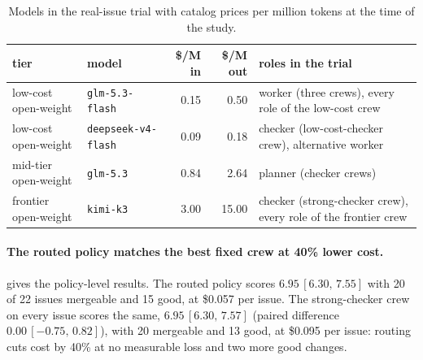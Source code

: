\documentclass[11pt,a4paper]{article}
\theoremstyle{definition}
\theoremstyle{remark}
\theoremstyle{definition}
\newcommand{\ci}[2]{\,[#1,\,#2]}
\begin{document}
\begin{table}[tbp]
\centering\small
\begin{tabularx}{\textwidth}{llrrX}\toprule
tier & model & \$/M in & \$/M out & roles in the trial\\\midrule
low-cost open-weight & \texttt{glm-5.3-flash} & 0.15 & 0.50 & worker (three crews), every role of the low-cost crew\\
low-cost open-weight & \texttt{deepseek-v4-flash} & 0.09 & 0.18 & checker (low-cost-checker crew), alternative worker\\
mid-tier open-weight & \texttt{glm-5.3} & 0.84 & 2.64 & planner (checker crews)\\
frontier open-weight & \texttt{kimi-k3} & 3.00 & 15.00 & checker (strong-checker crew), every role of the frontier crew\\
\bottomrule\end{tabularx}
\caption{Models in the real-issue trial with catalog prices per million tokens at the time of the study.}
\label{tab:models}
\end{table}

\paragraph{The routed policy matches the best fixed crew at 40\% lower cost.}
 gives the policy-level results. The routed policy scores $6.95\ci{6.30}{7.55}$ with 20 of 22 issues mergeable and 15 good, at \$0.057 per issue. The strong-checker crew on every issue scores the same, $6.95\ci{6.30}{7.57}$ (paired difference $0.00\ci{-0.75}{0.82}$), with 20 mergeable and 13 good, at \$0.095 per issue: routing cuts cost by 40\% at no measurable loss and two more good changes.

\begin{table}[tbp]
\centering\small

\caption{Policy-level results on 22 issues (14 defect fixes, 8 open-ended). Score: mean of two blind reviewers, 0--10, with a task-bootstrap 95\% CI. Mergeable: no reviewer rejects. Good: mergeable and score $\ge7$. Cost: mean provider bill per issue, all seats.}
\label{tab:trial}
\end{table}
\end{document}
